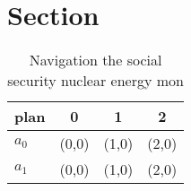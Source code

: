 \documentclass[a4paper]{article}
\begin{document}
\section{Section}

\begin{table}
\begin{adjustbox}{width=0.6\columnwidth}
\begin{tabular}{|l|l|l|l|}
\hline
\textbf{plan} & \multicolumn{1}{c|}{\textbf{0}} & \multicolumn{1}{c|}{\textbf{1}} & \multicolumn{1}{c|}{\textbf{2}} \\ \hline
\textbf{$a_0$}  & (0,0) & (1,0) & (2,0) \\ \hline
\textbf{$a_1$}  & (0,0) & (1,0) & (2,0) \\ \hline
\end{tabular}
\end{adjustbox}
\caption{Navigation the social security nuclear energy mon
}
\end{table}
\end{document}
